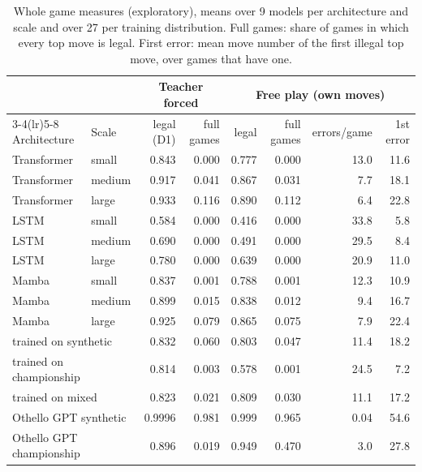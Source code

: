 \documentclass[11pt]{scrartcl}
\begin{document}
\begin{table}[H]
    \centering
    \small
    \setlength{\tabcolsep}{3.5pt}
    \begin{tabular}{llrrrrrr}
    \toprule
    & & \multicolumn{2}{c}{Teacher forced} & \multicolumn{4}{c}{Free play (own moves)} \\
    \cmidrule(lr){3-4}\cmidrule(lr){5-8}
    Architecture & Scale & legal (D1) & full games & legal & full games & errors/game & 1st error \\
    \midrule
    Transformer & small  & 0.843 & 0.000 & 0.777 & 0.000 & 13.0 & 11.6 \\
    Transformer & medium & 0.917 & 0.041 & 0.867 & 0.031 &  7.7 & 18.1 \\
    Transformer & large  & 0.933 & 0.116 & 0.890 & 0.112 &  6.4 & 22.8 \\
    LSTM        & small  & 0.584 & 0.000 & 0.416 & 0.000 & 33.8 &  5.8 \\
    LSTM        & medium & 0.690 & 0.000 & 0.491 & 0.000 & 29.5 &  8.4 \\
    LSTM        & large  & 0.780 & 0.000 & 0.639 & 0.000 & 20.9 & 11.0 \\
    Mamba       & small  & 0.837 & 0.001 & 0.788 & 0.001 & 12.3 & 10.9 \\
    Mamba       & medium & 0.899 & 0.015 & 0.838 & 0.012 &  9.4 & 16.7 \\
    Mamba       & large  & 0.925 & 0.079 & 0.865 & 0.075 &  7.9 & 22.4 \\
    \midrule
    \multicolumn{2}{l}{trained on synthetic}    & 0.832 & 0.060 & 0.803 & 0.047 & 11.4 & 18.2 \\
    \multicolumn{2}{l}{trained on championship} & 0.814 & 0.003 & 0.578 & 0.001 & 24.5 &  7.2 \\
    \multicolumn{2}{l}{trained on mixed}        & 0.823 & 0.021 & 0.809 & 0.030 & 11.1 & 17.2 \\
    \midrule
    \multicolumn{2}{l}{Othello GPT synthetic}    & 0.9996 & 0.981 & 0.999 & 0.965 & 0.04 & 54.6 \\
    \multicolumn{2}{l}{Othello GPT championship} & 0.896 & 0.019 & 0.949 & 0.470 & 3.0 & 27.8 \\
    \bottomrule
    \end{tabular}
    \caption{Whole game measures (exploratory), means over 9 models per architecture and scale and over 27 per
    training distribution. Full games: share of games in which every top move is legal. First error: mean
    move number of the first illegal top move, over games that have one.}
    \label{tab:sequence}
\end{table}
\end{document}
